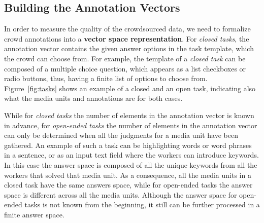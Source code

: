 


\subsection{Building the Annotation Vectors}
\label{sec:vectors}

In order to measure the quality of the crowdsourced data, we need to formalize crowd annotations into a \textbf{vector space representation}. For \emph{closed tasks}, the annotation vector contains the given answer options in the task template, which the crowd can choose from. For example, the template of a \emph{closed task} can be composed of a multiple choice question, which appears as a list checkboxes or radio buttons, thus, having a finite list of options to choose from. Figure~\ref{fig:tasks} shows an example of a closed and an open task, indicating also what the media units and annotations are for both cases.

While for \emph{closed tasks} the number of elements in the annotation vector is known in advance, for \emph{open-ended tasks} the number of elements in the annotation vector can only be determined when all the judgments for a media unit have been gathered. An example of such a task can be highlighting words or word phrases in a sentence, or as an input text field where the workers can introduce keywords. In this case the answer space is composed of all the unique keywords from all the workers that solved that media unit. As a consequence, all the media units in a closed task have the same answers space, while for open-ended tasks the answer space is different across all the media units. Although the answer space for open-ended tasks is not known from the beginning, it still can be further processed in a finite answer space.

